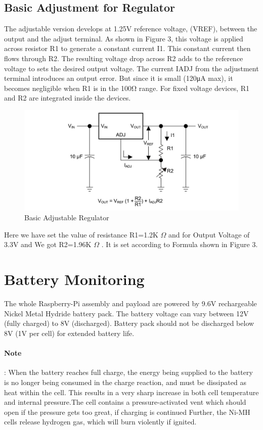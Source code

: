\documentclass[11pt,a4paper]{article}
\begin{document}
	\subsection{Basic Adjustment for Regulator}
	The adjustable version develops at 1.25V reference voltage, (VREF), between the output and the adjust terminal. As shown in Figure 3, this voltage is applied across resistor R1 to generate a constant current I1. This constant current then flows through R2. The resulting voltage drop across R2 adds to the reference voltage to sets the desired output voltage.
	The current IADJ from the adjustment terminal introduces an output error. But since it is small (120μA max), it becomes negligible when R1 is in the 100Ω range. For fixed voltage devices, R1 and R2 are integrated inside the devices.
	\begin{figure}[h!]
	
		\includegraphics[scale=0.43]{adj1585.jpg}
			\caption{Basic Adjustable Regulator}
	\end{figure}
	
	
	Here we have set the value of resistance R1=1.2K $\Omega$ and for Output Voltage of 3.3V and We got R2=1.96K $\Omega$ . It is set according to Formula shown in Figure 3.
	
		\section{Battery Monitoring}
	The whole Raspberry-Pi assembly and payload are powered by 9.6V rechargeable
	 Nickel Metal Hydride battery pack. The battery voltage can vary between 12V (fully charged) to 8V (discharged). Battery pack should not be discharged below 8V (1V per cell) for extended battery life.
	 
		
	\paragraph{Note}: When the battery reaches full charge, the energy being supplied to the battery is no longer being consumed in the charge reaction, and must be dissipated as heat within the cell. This results in a very sharp increase in both cell temperature and internal pressure.The cell contains a pressure-activated vent which should open if the pressure gets too great,  if charging is continued Further, the Ni-MH cells release hydrogen gas, which will burn violently if ignited.
	
\end{document}
